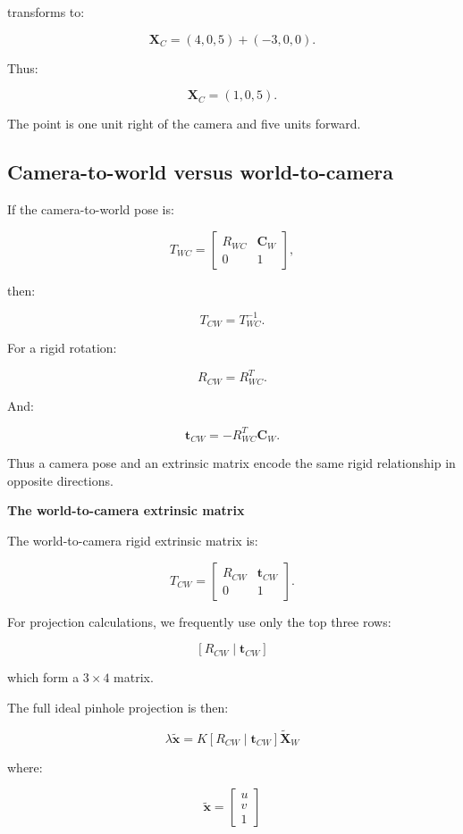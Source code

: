 transforms to:

\[
 \mathbf X_C= (4,0,5)+(-3,0,0).
\]

Thus:

\[
 \boxed{ \mathbf X_C=(1,0,5) }.
\]

The point is one unit right of the camera and five units forward.

\subsection{Camera-to-world versus world-to-camera}\label{02-foundations-ii-ch035-camera-to-world-versus-world-to-camera}

If the camera-to-world pose is:

\[
 T_{WC}= \begin{bmatrix} R_{WC}&\mathbf C_W\\ 0&1 \end{bmatrix},
\]

then:

\[
 \boxed{ T_{CW}=T_{WC}^{-1} }.
\]

For a rigid rotation:

\[
 R_{CW}=R_{WC}^T.
\]

And:

\[
 \boxed{ \mathbf t_{CW}=-R_{WC}^T\mathbf C_W }.
\]

Thus a camera pose and an extrinsic matrix encode the same rigid relationship in opposite directions.

\textbf{The world-to-camera extrinsic matrix}

The world-to-camera rigid extrinsic matrix is:

\[
 \boxed{ T_{CW}= \begin{bmatrix} R_{CW}&\mathbf t_{CW}\\ 0&1 \end{bmatrix} }.
\]

For projection calculations, we frequently use only the top three rows:

\[
 \boxed{ [R_{CW}\mid\mathbf t_{CW}] }
\]

which form a \(3\times4\) matrix.

The full ideal pinhole projection is then:

\[
 \boxed{ \lambda\tilde{\mathbf x} = K[R_{CW}\mid\mathbf t_{CW}] \tilde{\mathbf X}_W }
\]

where:

\[
 \tilde{\mathbf x}= \begin{bmatrix}u\\v\\1\end{bmatrix}
\]

